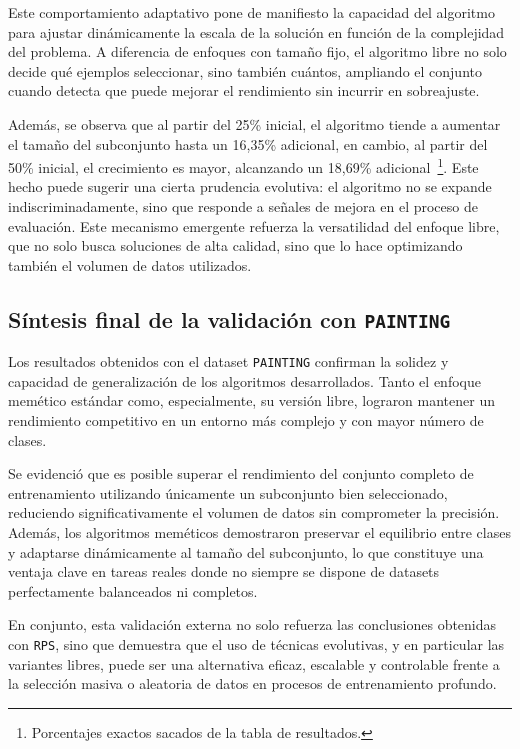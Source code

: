 Este comportamiento adaptativo pone de manifiesto la capacidad del algoritmo para ajustar dinámicamente la escala de la solución en función de la complejidad del problema.
A diferencia de enfoques con tamaño fijo, el algoritmo libre no solo decide qué ejemplos seleccionar, sino también cuántos,
ampliando el conjunto cuando detecta que puede mejorar el rendimiento sin incurrir en sobreajuste.

Además, se observa que al partir del 25\% inicial, el algoritmo tiende a aumentar el tamaño del subconjunto hasta un 16,35\% adicional,
en cambio, al partir del 50\% inicial, el crecimiento es mayor, alcanzando un 18,69\% adicional~\footnote{Porcentajes exactos sacados de la tabla de resultados.}.
Este hecho puede sugerir una cierta prudencia evolutiva: el algoritmo no se expande indiscriminadamente,
sino que responde a señales de mejora en el proceso de evaluación.
Este mecanismo emergente refuerza la versatilidad del enfoque libre, que no solo busca soluciones de alta calidad,
sino que lo hace optimizando también el volumen de datos utilizados.


\bigskip

\subsection*{Síntesis final de la validación con \texttt{PAINTING}}
Los resultados obtenidos con el dataset \texttt{PAINTING} confirman la solidez y capacidad de generalización de los algoritmos desarrollados.
Tanto el enfoque memético estándar como, especialmente, su versión libre, lograron mantener un rendimiento competitivo en un entorno más complejo y con mayor número de clases.

Se evidenció que es posible superar el rendimiento del conjunto completo de entrenamiento utilizando únicamente un subconjunto bien seleccionado,
reduciendo significativamente el volumen de datos sin comprometer la precisión.
Además, los algoritmos meméticos demostraron preservar el equilibrio entre clases y adaptarse dinámicamente al tamaño del subconjunto,
lo que constituye una ventaja clave en tareas reales donde no siempre se dispone de datasets perfectamente balanceados ni completos.

En conjunto, esta validación externa no solo refuerza las conclusiones obtenidas con \texttt{RPS},
sino que demuestra que el uso de técnicas evolutivas, y en particular las variantes libres, puede ser una alternativa eficaz,
escalable y controlable frente a la selección masiva o aleatoria de datos en procesos de entrenamiento profundo.
